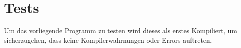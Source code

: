 \chapter{Tests}
\label{cha:tests}

Um das vorliegende Programm zu testen wird dieses als erstes Kompiliert, um sicherzugehen, dass keine Kompilerwahrnungen oder Errors auftreten. 